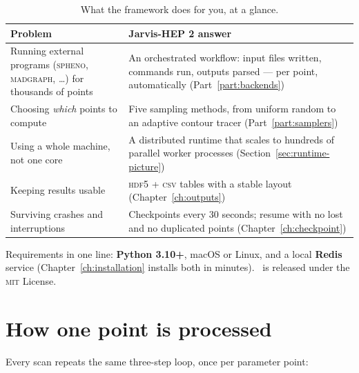 \begin{table}[ht]
  \footnotesize
  \begingroup
  \setlength{\tabcolsep}{0pt}
  \begin{tabular}{@{}p{0.34\linewidth}p{0.66\linewidth}@{}}
    \toprule
    \textbf{Problem} & \textbf{Jarvis-HEP 2 answer} \\
    \midrule
    Running external programs (\textsc{spheno}, \textsc{madgraph}, \ldots) for
      thousands of points & An orchestrated workflow: input files written, commands
      run, outputs parsed --- per point, automatically
      (Part~\ref{part:backends}) \\
    Choosing \emph{which} points to compute & Five sampling methods, from uniform
      random to an adaptive contour tracer (Part~\ref{part:samplers}) \\
    Using a whole machine, not one core & A distributed runtime that scales to
      hundreds of parallel worker processes (Section~\ref{sec:runtime-picture}) \\
    Keeping results usable & \textsc{hdf5} + \textsc{csv} tables with a stable layout
      (Chapter~\ref{ch:outputs}) \\
    Surviving crashes and interruptions & Checkpoints every 30 seconds; resume with no
      lost and no duplicated points (Chapter~\ref{ch:checkpoint}) \\
    \bottomrule
  \end{tabular}
  \endgroup
  \caption{What the framework does for you, at a glance.}
  \label{tab:at-a-glance}
\end{table}

\begin{jnote}
Requirements in one line: \textbf{Python 3.10+}, macOS or Linux, and a local
\textbf{Redis} service (Chapter~\ref{ch:installation} installs both in minutes).
\Jtwo\ is released under the \textsc{mit} License.
\end{jnote}

\section{How one point is processed}
\label{sec:mental-model}

Every scan repeats the same three-step loop, once per parameter point:

